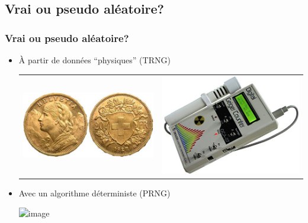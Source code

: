 \documentclass{beamer}
\newcommand\minitoc{
  \begin{frame}{\secname}
    \tableofcontents[currentsection, hideothersubsections, ] %
  \end{frame}
}
\newcommand\ignore[1]{}
\begin{document}
\subsection{Vrai ou pseudo aléatoire?}
\begin{frame}
  \frametitle{Vrai ou pseudo aléatoire?}
  \begin{itemize}
  \item<1-> À partir de données ``physiques'' (TRNG)
    \begin{center}
      \begin{tabular}{>{\centering}m{}>{\centering}m{}}
      \includegraphics[width=.2\textwidth]{img/vreneli.png}&
      \includegraphics[width=.3\textwidth]{img/geiger.png}        
      \end{tabular}
    \end{center}
  \item<2-> Avec un algorithme déterministe (PRNG)
  \begin{center}
    \begin{minipage}{0.65\textwidth}
    \includegraphics<2->[width=.8\textwidth]{img/xkcd_fair.png}
    \end{minipage}
    \par
  \end{center}
  \end{itemize}
\end{frame}

\ignore{
  \section{Générateurs de nombres pseudo-aléatoires}
  \minitoc
}
\end{document}

